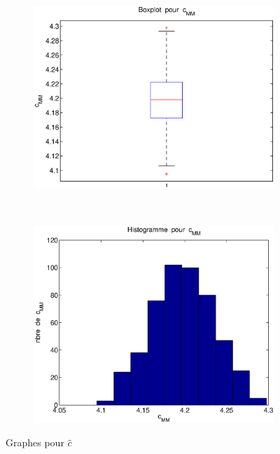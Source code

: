 \begin{figure}[!ht]
        \centering
        \begin{subfigure}[b]{0.4\textwidth}
                \includegraphics[width=\textwidth]{graphes/boxplot_cmm.eps}
        \end{subfigure}%
        ~
        \begin{subfigure}[b]{0.4\textwidth}
                \includegraphics[width=\textwidth]{graphes/hist_cmm.eps}
        \end{subfigure}
        \caption{Graphes pour $\hat{c}$}\label{fig:cmm}
\end{figure}

